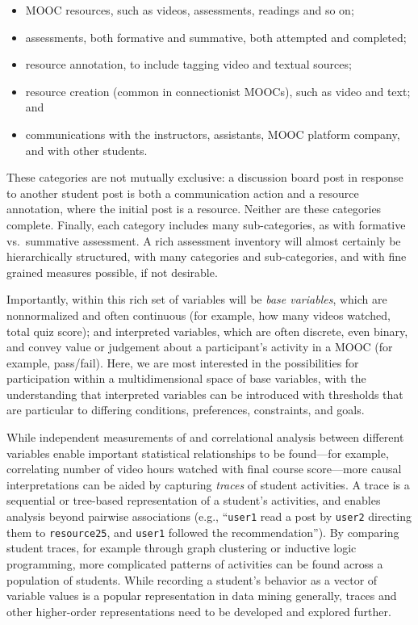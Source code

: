 \begin{itemize}

\item MOOC resources,
such as videos, assessments, readings and so on;

\item assessments, both
formative and summative, both attempted and completed; 

\item resource
annotation, to include tagging video and textual sources; 

\item resource
creation (common in connectionist MOOCs), such as video and text; and

\item communications with the instructors, assistants, MOOC platform company,
and with other students.

\end{itemize}

These categories are not mutually exclusive:  a discussion board
post in response to another student post is both a communication action
and a resource annotation, where the initial post
is a resource.  Neither are these categories
complete. Finally, each category includes many
sub-categories, as with  formative vs.\ summative
assessment. A rich assessment inventory will almost certainly be
hierarchically structured, with many categories and sub-categories, and
with fine grained measures possible, if not desirable.

Importantly, within this rich set of variables will be \emph{base variables},
which are nonnormalized and often continuous (for example, how many videos
watched, total quiz score); and interpreted variables, which are often
discrete, even binary, and convey value or judgement about a
participant's activity in a MOOC (for example, pass/fail). Here, we
are most interested in the possibilities for participation within a
multidimensional space of base variables, with the understanding that
interpreted variables can be introduced with thresholds that are
particular to differing conditions, preferences, constraints, and goals.

While independent measurements of and correlational analysis between
different variables 
enable important statistical relationships to be found---for example,
correlating number of video hours watched with final course score---more causal
interpretations can be aided by capturing \emph{traces} of student
activities. A trace is a sequential or tree-based representation of a
student's activities, and enables analysis beyond pairwise associations
(e.g., ``\texttt{user1} read a post by \texttt{user2} directing them to
\texttt{resource25},  and
\texttt{user1} followed the recommendation''). By comparing student traces, for
example through graph clustering or inductive logic programming, more
complicated patterns of activities can be found across a population of
students. While recording a student's behavior as a vector of variable
values is a popular representation in data mining generally, traces and
other higher-order representations need to be developed and explored
further.  

